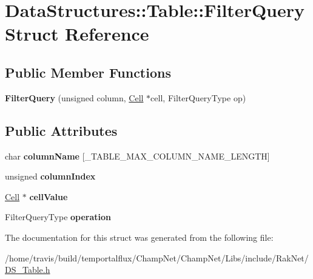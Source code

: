 \hypertarget{struct_data_structures_1_1_table_1_1_filter_query}{\section{Data\-Structures\-:\-:Table\-:\-:Filter\-Query Struct Reference}
\label{struct_data_structures_1_1_table_1_1_filter_query}
}
\subsection*{Public Member Functions}
\begin{DoxyCompactItemize}
\item 
\hypertarget{struct_data_structures_1_1_table_1_1_filter_query_a003ef1cb36bd80f6199bd39491c3519b}{{\bfseries Filter\-Query} (unsigned column, \hyperlink{struct_data_structures_1_1_table_1_1_cell}{Cell} $\ast$cell, Filter\-Query\-Type op)}\label{struct_data_structures_1_1_table_1_1_filter_query_a003ef1cb36bd80f6199bd39491c3519b}

\end{DoxyCompactItemize}
\subsection*{Public Attributes}
\begin{DoxyCompactItemize}
\item 
\hypertarget{struct_data_structures_1_1_table_1_1_filter_query_acb1fc87ccc2e5beb7f0702bd216c845d}{char {\bfseries column\-Name} \mbox{[}\-\_\-\-T\-A\-B\-L\-E\-\_\-\-M\-A\-X\-\_\-\-C\-O\-L\-U\-M\-N\-\_\-\-N\-A\-M\-E\-\_\-\-L\-E\-N\-G\-T\-H\mbox{]}}\label{struct_data_structures_1_1_table_1_1_filter_query_acb1fc87ccc2e5beb7f0702bd216c845d}

\item 
\hypertarget{struct_data_structures_1_1_table_1_1_filter_query_a751a903835cd6d13d817e624b42a2bfd}{unsigned {\bfseries column\-Index}}\label{struct_data_structures_1_1_table_1_1_filter_query_a751a903835cd6d13d817e624b42a2bfd}

\item 
\hypertarget{struct_data_structures_1_1_table_1_1_filter_query_ab9f39f1bb6ee7863a2f3d419bc24ca85}{\hyperlink{struct_data_structures_1_1_table_1_1_cell}{Cell} $\ast$ {\bfseries cell\-Value}}\label{struct_data_structures_1_1_table_1_1_filter_query_ab9f39f1bb6ee7863a2f3d419bc24ca85}

\item 
\hypertarget{struct_data_structures_1_1_table_1_1_filter_query_acef81569cbccb0b56d21418360632551}{Filter\-Query\-Type {\bfseries operation}}\label{struct_data_structures_1_1_table_1_1_filter_query_acef81569cbccb0b56d21418360632551}

\end{DoxyCompactItemize}


The documentation for this struct was generated from the following file\-:\begin{DoxyCompactItemize}
\item 
/home/travis/build/temportalflux/\-Champ\-Net/\-Champ\-Net/\-Libs/include/\-Rak\-Net/\hyperlink{_d_s___table_8h}{D\-S\-\_\-\-Table.\-h}\end{DoxyCompactItemize}
